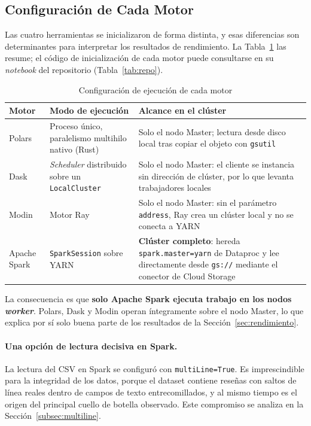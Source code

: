 \subsection{Configuración de Cada Motor}

Las cuatro herramientas se inicializaron de forma distinta, y esas diferencias son determinantes para interpretar los resultados de rendimiento. La Tabla~\ref{tab:motores} las resume; el código de inicialización de cada motor puede consultarse en su \textit{notebook} del repositorio (Tabla~\ref{tab:repo}).

\begin{table}[H]
\centering
\caption{Configuración de ejecución de cada motor}
\label{tab:motores}
\vspace{0.2cm}
\small
\begin{tabular}{@{}lp{4.2cm}p{5.2cm}@{}}
\toprule
\textbf{Motor} & \textbf{Modo de ejecución} & \textbf{Alcance en el clúster} \\
\midrule
Polars & Proceso único, paralelismo multihilo nativo (Rust) & Solo el nodo Master; lectura desde disco local tras copiar el objeto con \texttt{gsutil} \\[0.3cm]
Dask & \textit{Scheduler} distribuido sobre un \texttt{LocalCluster} & Solo el nodo Master: el cliente se instancia sin dirección de clúster, por lo que levanta trabajadores locales \\[0.3cm]
Modin & Motor Ray & Solo el nodo Master: sin el parámetro \texttt{address}, Ray crea un clúster local y no se conecta a YARN \\[0.3cm]
Apache Spark & \texttt{SparkSession} sobre YARN & \textbf{Clúster completo}: hereda \texttt{spark.master=yarn} de Dataproc y lee directamente desde \texttt{gs://} mediante el conector de Cloud Storage \\
\bottomrule
\end{tabular}
\end{table}

La consecuencia es que \textbf{solo Apache Spark ejecuta trabajo en los nodos \textit{worker}}. Polars, Dask y Modin operan íntegramente sobre el nodo Master, lo que explica por sí solo buena parte de los resultados de la Sección~\ref{sec:rendimiento}.

\paragraph{Una opción de lectura decisiva en Spark.} La lectura del CSV en Spark se configuró con \texttt{multiLine=True}. Es imprescindible para la integridad de los datos, porque el dataset contiene reseñas con saltos de línea reales dentro de campos de texto entrecomillados, y al mismo tiempo es el origen del principal cuello de botella observado. Este compromiso se analiza en la Sección~\ref{subsec:multiline}.

